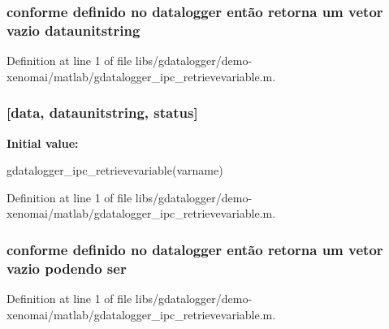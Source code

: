 \subsubsection[{dataunitstring}]{\setlength{\rightskip}{0pt plus 5cm}conforme definido no datalogger então retorna um vetor vazio {\bf dataunitstring}}\label{libs_2gdatalogger_2demo-xenomai_2matlab_2gdatalogger__ipc__retrievevariable_8m_a0170ec389057b3cd5906e3a196aea560}


Definition at line 1 of file libs/gdatalogger/demo-\/xenomai/matlab/gdatalogger\_\-ipc\_\-retrievevariable.m.
\subsubsection[{function}]{[{\bf data}, {\bf dataunitstring}, {\bf status}]}\label{libs_2gdatalogger_2demo-xenomai_2matlab_2gdatalogger__ipc__retrievevariable_8m_ac132315a15f73d90d100c0d10aaa8c88}
{\bfseries Initial value:}
\begin{DoxyCode}
 gdatalogger_ipc_retrievevariable(varname)
%
% 
\end{DoxyCode}


Definition at line 1 of file libs/gdatalogger/demo-\/xenomai/matlab/gdatalogger\_\-ipc\_\-retrievevariable.m.
\subsubsection[{ser}]{\setlength{\rightskip}{0pt plus 5cm}conforme definido no datalogger então retorna um vetor vazio podendo {\bf ser}}\label{libs_2gdatalogger_2demo-xenomai_2matlab_2gdatalogger__ipc__retrievevariable_8m_a2865119cb33b58b219255e4beeaa5356}


Definition at line 1 of file libs/gdatalogger/demo-\/xenomai/matlab/gdatalogger\_\-ipc\_\-retrievevariable.m.